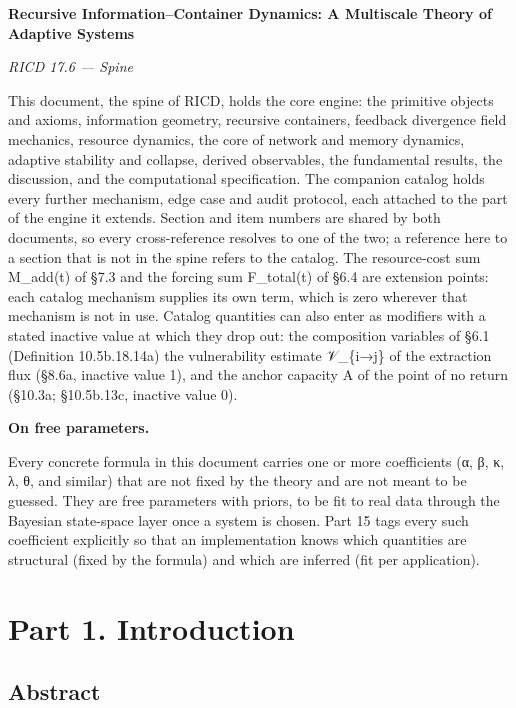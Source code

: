 \documentclass[
]{article}
\author{}
\date{}
\begin{document}
\textbf{Recursive Information--Container Dynamics: A Multiscale Theory
of Adaptive Systems}

\emph{RICD 17.6 --- Spine}

This document, the spine of RICD, holds the core engine: the primitive
objects and axioms, information geometry, recursive containers, feedback
divergence field mechanics, resource dynamics, the core of network and
memory dynamics, adaptive stability and collapse, derived observables,
the fundamental results, the discussion, and the computational
specification. The companion catalog holds every further mechanism, edge
case and audit protocol, each attached to the part of the engine it
extends. Section and item numbers are shared by both documents, so every
cross-reference resolves to one of the two; a reference here to a
section that is not in the spine refers to the catalog. The
resource-cost sum M\_add(t) of §7.3 and the forcing sum F\_total(t) of
§6.4 are extension points: each catalog mechanism supplies its own term,
which is zero wherever that mechanism is not in use. Catalog quantities
can also enter as modifiers with a stated inactive value at which they
drop out: the composition variables of §6.1 (Definition 10.5b.18.14a)
the vulnerability estimate 𝒱\_\{i→j\} of the extraction flux (§8.6a,
inactive value 1), and the anchor capacity A of the point of no return
(§10.3a; §10.5b.13c, inactive value 0).

\textbf{On free parameters.}

Every concrete formula in this document carries one or more coefficients
(α, β, κ, λ, θ, and similar) that are not fixed by the theory and are
not meant to be guessed. They are free parameters with priors, to be fit
to real data through the Bayesian state-space layer once a system is
chosen. Part 15 tags every such coefficient explicitly so that an
implementation knows which quantities are structural (fixed by the
formula) and which are inferred (fit per application).

\hypertarget{part-1.-introduction}{%
\section{Part 1. Introduction}\label{part-1.-introduction}}

\hypertarget{abstract}{%
\subsection{Abstract}\label{abstract}}
\end{document}
